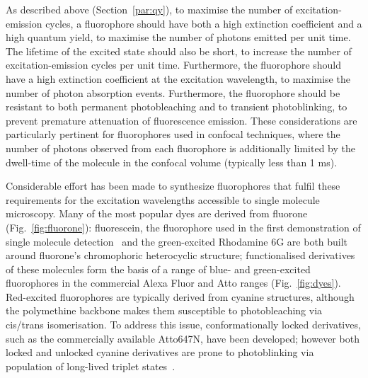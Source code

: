 As described above (Section~\ref{par:qy}), to maximise the number of excitation-emission cycles, a fluorophore should have both a high extinction coefficient and a high quantum yield, to maximise the number of photons emitted per unit time. The lifetime of the excited state should also be short, to increase the number of excitation-emission cycles per unit time. Furthermore, the fluorophore should have a high extinction coefficient at the excitation wavelength, to maximise the number of photon absorption events. Furthermore, the fluorophore should be resistant to both permanent photobleaching and to transient photoblinking, to prevent premature attenuation of fluorescence emission. These considerations are particularly pertinent for fluorophores used in confocal techniques, where the number of photons observed from each fluorophore is additionally limited by the dwell-time of the molecule in the confocal volume (typically less than 1 ms).

Considerable effort has been made to synthesize fluorophores that fulfil these requirements for the excitation wavelengths accessible to single molecule microscopy. Many of the most popular dyes are derived from fluorone (Fig.~\ref{fig:fluorone}): fluorescein, the fluorophore used in the first demonstration of single molecule detection~\cite{Sun1997} and the green-excited Rhodamine 6G are both built around fluorone's chromophoric heterocyclic structure; functionalised derivatives of these molecules form the basis of a range of blue- and green-excited fluorophores in the commercial Alexa Fluor and Atto ranges (Fig.~\ref{fig:dyes}). Red-excited fluorophores are typically derived from cyanine structures, although the polymethine backbone makes them susceptible to photobleaching via cis/trans isomerisation. To address this issue, conformationally locked derivatives, such as the commercially available Atto647N, have been developed; however both locked and unlocked cyanine derivatives are prone to photoblinking via population of long-lived triplet states~\cite{zondervan03}.


